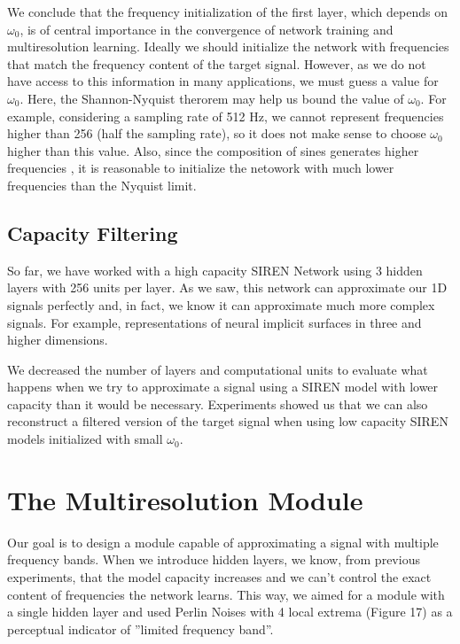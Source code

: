 We conclude that the frequency initialization of the first layer, which depends on $\omega_0$, is of central importance in the convergence of network training and multiresolution learning.
Ideally we should initialize the network with frequencies that match the frequency content of the target signal. However, as we do not have access to this information in many applications, we must guess a value for $\omega_0$. Here, the Shannon-Nyquist therorem may help us bound the value of $\omega_0$. For example, considering a sampling rate of 512 Hz, we cannot represent frequencies higher than 256 (half the sampling rate), so it does not make sense to choose $\omega_0$ higher than this value. Also, since the composition of sines generates higher frequencies \cite{novello2022understanding}, it is reasonable to initialize the netowork with much lower frequencies than the Nyquist limit.

\subsection{Capacity Filtering}

So far, we have worked with a high capacity SIREN Network using 3 hidden layers with 256 units per layer. As we saw, this network can approximate our 1D signals perfectly and, in fact, we know it can approximate much more complex signals. For example, representations of neural implicit surfaces in three and higher dimensions.

We decreased the number of layers and computational units to evaluate what happens when we try to approximate a signal using a SIREN model with lower capacity than it would be necessary. Experiments showed us that we can also reconstruct a filtered version of the target signal when using low capacity SIREN models initialized with small $\omega_0$.


\section{The Multiresolution Module}

Our goal is to design a module capable of approximating a signal with multiple frequency bands. When we introduce hidden layers, we know, from previous experiments, that the model capacity increases and we can’t control the exact content of frequencies the network learns. This way, we aimed for a module with a single hidden layer and used Perlin Noises with 4 local extrema (Figure 17) as a perceptual indicator of ”limited frequency band”.

